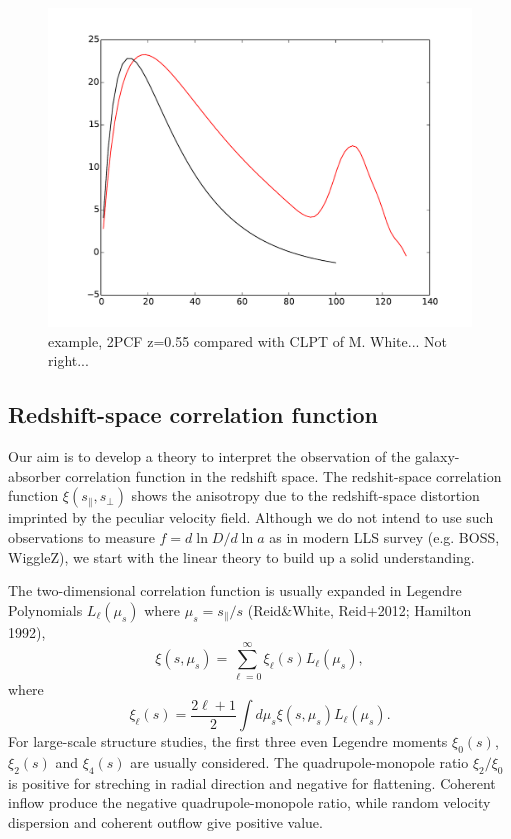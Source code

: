 \documentclass[useAMS,usenatbib,twocolumn]{mn2e}
\begin{document}
\begin{figure}
 \begin{center}
  \includegraphics[angle=0,width=\columnwidth]{figure/2PCF.pdf}
  \caption{example, 2PCF z=0.55 compared with CLPT of M. White...
  Not right...}
 \end{center}
\end{figure}



\subsection{Redshift-space correlation function}
Our aim is to develop a theory to interpret the observation of the 
galaxy-absorber correlation function in the redshift space. 
The redshit-space correlation function $\xi(s_\parallel,s_\perp)$ shows the 
anisotropy due to the redshift-space distortion imprinted by the peculiar 
velocity field. Although we do not intend to use such observations to measure 
$f=d\ln D/d\ln a$ as in modern LLS survey (e.g. BOSS, WiggleZ), we start with 
the linear theory to build up a solid understanding.


The two-dimensional correlation function is usually expanded in Legendre
Polynomials $L_\ell(\mu_s)$ where $\mu_s=s_\parallel/s$ (Reid\&White, Reid+2012;
Hamilton 1992),
\begin{equation}
\xi(s,\mu_s)=\sum_{\ell=0}^\infty\xi_\ell(s)L_\ell(\mu_s),
\end{equation}
where
\begin{equation}
\xi_\ell(s)=\frac{2\ell+1}{2}\int d\mu_s \xi(s,\mu_s)L_\ell(\mu_s).
\end{equation}
For large-scale structure studies, the first three even Legendre moments
$\xi_0(s)$, $\xi_2(s)$ and $\xi_4(s)$ are usually considered. 
The quadrupole-monopole ratio $\xi_2/\xi_0$ is positive for streching
in radial direction and negative for flattening. Coherent inflow produce
the negative quadrupole-monopole ratio, while random velocity dispersion
and coherent outflow give positive value.
\end{document}
